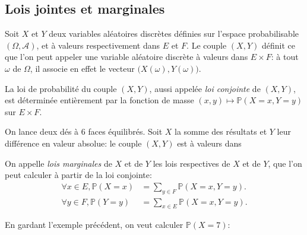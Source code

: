 \subsection{Lois jointes et marginales}

\begin{definition}
Soit $X$ et $Y$ deux variables aléatoires discrètes définies sur l'espace probabilisable $(\Omega,\mathcal{A})$, et à valeurs respectivement dans $E$ et $F$. Le couple $(X, Y)$ définit ce que l'on peut appeler une variable aléatoire discrète à valeurs dans $E \times F$: à tout $\omega$ de $\Omega$, il associe en effet le vecteur $\big( X(\omega), Y(\omega) \big)$.
\end{definition}

\begin{proposition}
La loi de probabilité du couple $(X,Y)$, aussi appelée \emph{loi conjointe} de $(X,Y)$, est déterminée entièrement par la fonction de masse $(x,y) \mapsto \mathbb{P} (X=x,Y=y)$ sur $E \times F$.
\end{proposition}
\sld{\vfill\pagebreak[5]}%

\begin{exemple}
	On lance deux dés à 6 faces équilibrés. Soit $X$ la somme des résultats et $Y$ leur différence en valeur absolue: le couple $(X,Y)$ est à valeurs dans \pl{\rep{3cm}}
\end{exemple}
\sld{\vfill\pagebreak[5]}%
\begin{definition}
On appelle \emph{lois marginales} de $X$ et de $Y$ les lois respectives de $X$ et de $Y$, que l'on peut calculer à partir de la loi conjointe:
\begin{align*}
	\forall x \in E, \mathbb{P} (X=x) &= \sum_{y \in F} \mathbb{P} (X=x,Y=y). \\
	\forall y \in F, \mathbb{P} (Y=y) &= \sum_{x \in E} \mathbb{P} (X=x,Y=y).
\end{align*}
\end{definition}

\begin{exemple}
	En gardant l'exemple précédent, on veut calculer  $\mathbb{P} (X=7) $:
	\pl{\rep{5cm}}
\sld{	\[ 
		\mathbb{P} (X=7)=\mathbb{P} (X=7,Y=1)+\mathbb{P} (X=7,Y=3)+\mathbb{P} (X=7,Y=5)=\frac{1}{18}+\frac{1}{18}+\frac{1}{18}=\frac{1}{6}.
	\]
}
\end{exemple}
\sld{\vfill\pagebreak[5]}%
